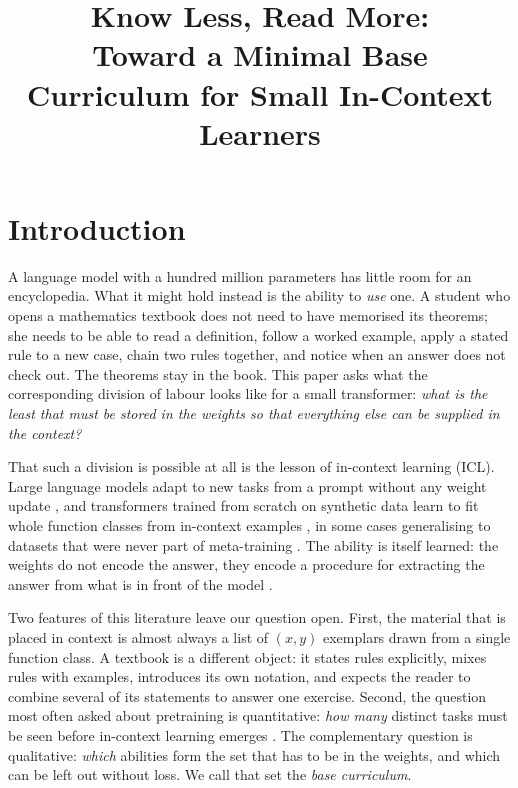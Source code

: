 \documentclass[11pt]{article}
\title{\textbf{Know Less, Read More:}\\[2pt]
\Large Toward a Minimal Base Curriculum for Small In-Context Learners}
\author{}
\date{}
\begin{document}
\maketitle

\begin{abstract}

\end{abstract}

\section{Introduction}

A language model with a hundred million parameters has little room for an encyclopedia.
What it might hold instead is the ability to \emph{use} one.
A student who opens a mathematics textbook does not need to have memorised its theorems; she needs to be able to read a definition, follow a worked example, apply a stated rule to a new case, chain two rules together, and notice when an answer does not check out.
The theorems stay in the book.
This paper asks what the corresponding division of labour looks like for a small transformer: \emph{what is the least that must be stored in the weights so that everything else can be supplied in the context?}

That such a division is possible at all is the lesson of in-context learning (ICL).
Large language models adapt to new tasks from a prompt without any weight update \citep{brown2020gpt3}, and transformers trained from scratch on synthetic data learn to fit whole function classes from in-context examples \citep{garg2022what}, in some cases generalising to datasets that were never part of meta-training \citep{kirsch2022gpicl,hollmann2023tabpfn}.
The ability is itself learned: the weights do not encode the answer, they encode a procedure for extracting the answer from what is in front of the model \citep{akyurek2023what,vonoswald2023gd,bai2023statisticians}.

Two features of this literature leave our question open.
First, the material that is placed in context is almost always a list of $(x, y)$ exemplars drawn from a single function class.
A textbook is a different object: it states rules explicitly, mixes rules with examples, introduces its own notation, and expects the reader to combine several of its statements to answer one exercise.
Second, the question most often asked about pretraining is quantitative: \emph{how many} distinct tasks must be seen before in-context learning emerges \citep{raventos2023diversity,he2024grok,goddard2025when,nguyen2025kinetics}.
The complementary question is qualitative: \emph{which} abilities form the set that has to be in the weights, and which can be left out without loss.
We call that set the \emph{base curriculum}.
\end{document}
